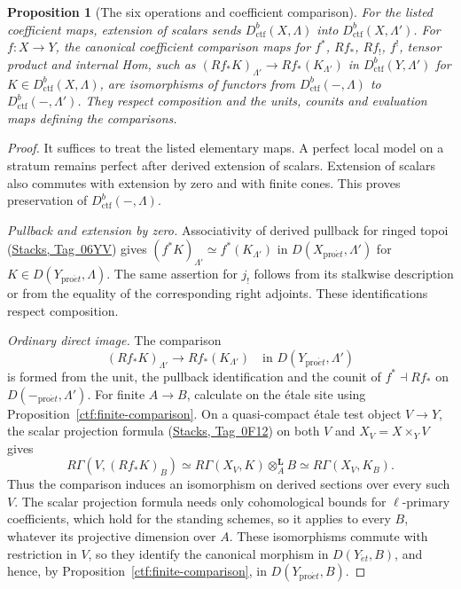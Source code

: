 \documentclass[11pt,a4paper]{article}
\numberwithin{equation}{section}
\newtheorem{proposition}[theorem]{Proposition}
\theoremstyle{definition}
\theoremstyle{remark}
\newcommand{\et}{\acute{e}t}
\newcommand{\proet}{\mathrm{pro}\acute{e}t}
\newcommand{\stacks}[1]{\href{https://stacks.math.columbia.edu/tag/#1}{\textnormal{Stacks, Tag~#1}}}
\newcommand{\Dctf}{D^b_{\mathrm{ctf}}}
\begin{document}
\begin{proposition}[The six operations and coefficient comparison]
\label{n:scalar-six}
For the listed coefficient maps, extension of scalars sends
$\Dctf(X,\Lambda)$ into $\Dctf(X,\Lambda')$.
For $f\colon X\to Y$, the canonical coefficient comparison maps for
$f^*$, $Rf_*$, $Rf_!$, $f^!$, tensor product and internal Hom, such as
$(Rf_*K)_{\Lambda'}\to Rf_*(K_{\Lambda'})$ in $\Dctf(Y,\Lambda')$ for
$K\in\Dctf(X,\Lambda)$, are isomorphisms of functors from
$\Dctf(-,\Lambda)$ to $\Dctf(-,\Lambda')$. They respect composition and the units,
counits and evaluation maps defining the comparisons.
\end{proposition}
\begin{proof}
It suffices to treat the listed elementary maps. A perfect local model
on a stratum remains perfect after derived extension of scalars.
Extension of scalars also commutes with extension by zero and with
finite cones. This proves preservation of $\Dctf(-,\Lambda)$.

\emph{Pullback and extension by zero.}
Associativity of derived pullback for ringed topoi (\stacks{06YV})
gives $(f^*K)_{\Lambda'}\simeq f^*(K_{\Lambda'})$ in
$D(X_{\proet},\Lambda')$ for $K\in D(Y_{\proet},\Lambda)$.
The same assertion for $j_!$ follows from its stalkwise description
or from the equality of the corresponding right adjoints. These
identifications respect composition.

\emph{Ordinary direct image.}
The comparison
\[
 (Rf_*K)_{\Lambda'}\longrightarrow Rf_*(K_{\Lambda'})
 \quad\text{in }D(Y_{\proet},\Lambda')
\]
is formed from the unit, the pullback identification and the counit
of $f^*\dashv Rf_*$ on $D(-_{\proet},\Lambda')$. For finite $A\to B$, calculate on the \'etale
site using Proposition~\ref{ctf:finite-comparison}. On a
quasi-compact \'etale test object $V\to Y$, the scalar projection
formula (\stacks{0F12}) on both $V$ and $X_V=X\times_YV$ gives
\[
 R\Gamma(V,(Rf_*K)_B)
  \simeq R\Gamma(X_V,K)\otimes_A^{\mathbf L}B
  \simeq R\Gamma(X_V,K_B).
\]
Thus the comparison induces an isomorphism on derived sections over
every such $V$. The scalar projection formula needs only cohomological
bounds for $\ell$-primary coefficients, which hold for the standing
schemes, so it applies to every $B$, whatever its projective dimension
over $A$. These isomorphisms commute with restriction in $V$, so they
identify the canonical morphism in $D(Y_{\et},B)$, and hence, by
Proposition~\ref{ctf:finite-comparison}, in $D(Y_{\proet},B)$.


\end{proof}
\end{document}
